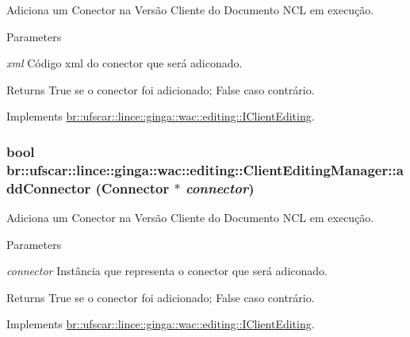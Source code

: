 Adiciona um Conector na Versão Cliente do Documento NCL em execução. 


\begin{DoxyParams}{Parameters}
\item[{\em xml}]Código xml do conector que será adiconado. \end{DoxyParams}
\begin{DoxyReturn}{Returns}
True se o conector foi adicionado; False caso contrário. 
\end{DoxyReturn}


Implements \hyperlink{classbr_1_1ufscar_1_1lince_1_1ginga_1_1wac_1_1editing_1_1IClientEditing_a531eb37bc22963dcb2feeed0e07591bd}{br::ufscar::lince::ginga::wac::editing::IClientEditing}.

\hypertarget{classbr_1_1ufscar_1_1lince_1_1ginga_1_1wac_1_1editing_1_1ClientEditingManager_afbc2f133a39eff4008bba3817f8c76a1}{
\subsubsection[{addConnector}]{\setlength{\rightskip}{0pt plus 5cm}bool br::ufscar::lince::ginga::wac::editing::ClientEditingManager::addConnector (Connector $\ast$ {\em connector})}}
\label{classbr_1_1ufscar_1_1lince_1_1ginga_1_1wac_1_1editing_1_1ClientEditingManager_afbc2f133a39eff4008bba3817f8c76a1}


Adiciona um Conector na Versão Cliente do Documento NCL em execução. 


\begin{DoxyParams}{Parameters}
\item[{\em connector}]Instância que representa o conector que será adiconado. \end{DoxyParams}
\begin{DoxyReturn}{Returns}
True se o conector foi adicionado; False caso contrário. 
\end{DoxyReturn}


Implements \hyperlink{classbr_1_1ufscar_1_1lince_1_1ginga_1_1wac_1_1editing_1_1IClientEditing_ac3ce7f9f55bc61cb7166b741a73e77d9}{br::ufscar::lince::ginga::wac::editing::IClientEditing}.

